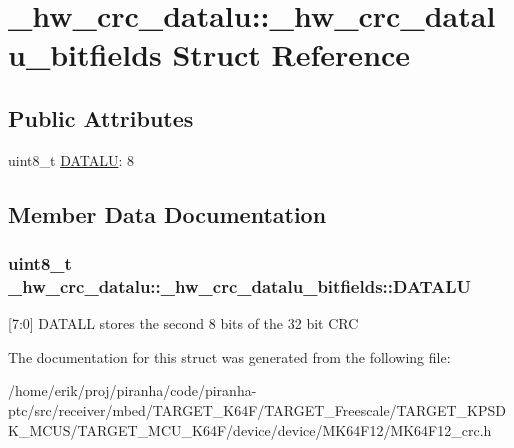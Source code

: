 \hypertarget{struct__hw__crc__datalu_1_1__hw__crc__datalu__bitfields}{}\section{\+\_\+hw\+\_\+crc\+\_\+datalu\+:\+:\+\_\+hw\+\_\+crc\+\_\+datalu\+\_\+bitfields Struct Reference}
\label{struct__hw__crc__datalu_1_1__hw__crc__datalu__bitfields}
\subsection*{Public Attributes}
\begin{DoxyCompactItemize}
\item 
uint8\+\_\+t \hyperlink{struct__hw__crc__datalu_1_1__hw__crc__datalu__bitfields_a8dcefed3263985ca09b19226345b0895}{D\+A\+T\+A\+LU}\+: 8
\end{DoxyCompactItemize}


\subsection{Member Data Documentation}
\subsubsection[{\texorpdfstring{D\+A\+T\+A\+LU}{DATALU}}]{\setlength{\rightskip}{0pt plus 5cm}uint8\+\_\+t \+\_\+hw\+\_\+crc\+\_\+datalu\+::\+\_\+hw\+\_\+crc\+\_\+datalu\+\_\+bitfields\+::\+D\+A\+T\+A\+LU}\hypertarget{struct__hw__crc__datalu_1_1__hw__crc__datalu__bitfields_a8dcefed3263985ca09b19226345b0895}{}\label{struct__hw__crc__datalu_1_1__hw__crc__datalu__bitfields_a8dcefed3263985ca09b19226345b0895}
\mbox{[}7\+:0\mbox{]} D\+A\+T\+A\+LL stores the second 8 bits of the 32 bit C\+RC 

The documentation for this struct was generated from the following file\+:\begin{DoxyCompactItemize}
\item 
/home/erik/proj/piranha/code/piranha-\/ptc/src/receiver/mbed/\+T\+A\+R\+G\+E\+T\+\_\+\+K64\+F/\+T\+A\+R\+G\+E\+T\+\_\+\+Freescale/\+T\+A\+R\+G\+E\+T\+\_\+\+K\+P\+S\+D\+K\+\_\+\+M\+C\+U\+S/\+T\+A\+R\+G\+E\+T\+\_\+\+M\+C\+U\+\_\+\+K64\+F/device/device/\+M\+K64\+F12/M\+K64\+F12\+\_\+crc.\+h\end{DoxyCompactItemize}
